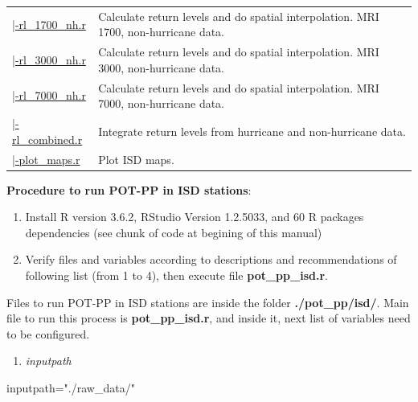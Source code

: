 \documentclass[12pt,oneside]{reedthesis}
\newenvironment{Shaded}{\begin{snugshade}}{\end{snugshade}}
\newcommand{\NormalTok}[1]{#1}
\newcommand{\StringTok}[1]{\textcolor[rgb]{0.31,0.60,0.02}{#1}}
\providecommand{\tightlist}{%
  \setlength{\itemsep}{0pt}\setlength{\parskip}{0pt}}
\begin{document}
\begin{longtable}[t]{>{\raggedright\arraybackslash}p{1.3in}>{\raggedright\arraybackslash}p{4.9in}}
\href{ftp://ftp.geocorp.co/windthesis/code/pot_pp/isd/maps/return_levels_1700_nh.r}{\;\;\;\;\;\;\;\;|-rl\_1700\_nh.r} & Calculate return levels and do spatial interpolation. MRI 1700, non-hurricane data.\\
\href{ftp://ftp.geocorp.co/windthesis/code/pot_pp/isd/maps/return_levels_3000_nh.r}{\;\;\;\;\;\;\;\;|-rl\_3000\_nh.r} & Calculate return levels and do spatial interpolation. MRI 3000, non-hurricane data.\\
\href{ftp://ftp.geocorp.co/windthesis/code/pot_pp/isd/maps/return_levels_7000_nh.r}{\;\;\;\;\;\;\;\;|-rl\_7000\_nh.r} & Calculate return levels and do spatial interpolation. MRI 7000, non-hurricane data.\\
\href{ftp://ftp.geocorp.co/windthesis/code/pot_pp/isd/maps/return_levels_combined.r}{\;\;\;\;\;\;\;\;|-rl\_combined.r} & Integrate return levels from hurricane and non-hurricane data.\\
\href{ftp://ftp.geocorp.co/windthesis/code/pot_pp/isd/maps/plot_maps.r}{\;\;\;\;\;\;\;\;|-plot\_maps.r} & Plot ISD maps.\\
\bottomrule
\end{longtable}
\endgroup{}

\textbf{Procedure to run POT-PP in ISD stations}:
\begin{enumerate}
\def\labelenumi{\arabic{enumi}.}
\item
  Install R version 3.6.2, RStudio Version 1.2.5033, and 60 R packages dependencies (see chunk of code at begining of this manual)
\item
  Verify files and variables according to descriptions and recommendations of following list (from 1 to 4), then execute file \textbf{pot\_pp\_isd.r}.
\end{enumerate}
Files to run POT-PP in ISD stations are inside the folder \textbf{./pot\_pp/isd/}. Main file to run this process is \textbf{pot\_pp\_isd.r}, and inside it, next list of variables need to be configured.
\begin{enumerate}
\def\labelenumi{\arabic{enumi}.}
\tightlist
\item
  \emph{inputpath}
\end{enumerate}
\scriptsize

\vspace{0.4cm}
\begin{Shaded}
\begin{Highlighting}[]
\NormalTok{      inputpath=}\StringTok{"./raw_data/"}
\end{Highlighting}
\end{Shaded}
\normalsize
\end{document}
